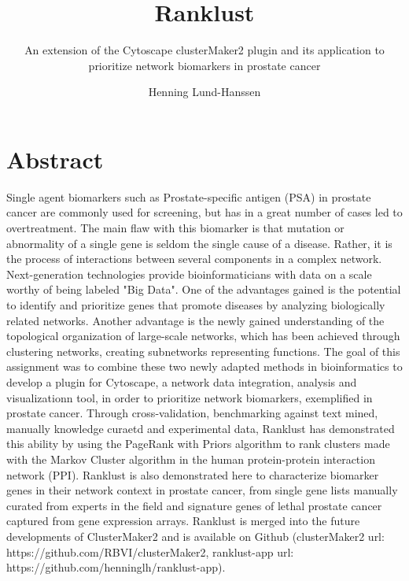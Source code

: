 \documentclass[a4paper,UKenglish]{ifimaster}
\title{Ranklust}
\subtitle{An extension of the Cytoscape clusterMaker2 plugin and its application
to prioritize network biomarkers in prostate cancer}
\author{Henning Lund-Hanssen}
\begin{document}
\duoforside[program={Programming and Networks},
    dept={Department of Informatics},long]

\frontmatter{}

\setlength{\parskip}{12pt}
\setlength{\parindent}{12pt}

\chapter*{Abstract}
Single agent biomarkers such as Prostate-specific antigen (PSA) in prostate
cancer are commonly used for screening, but has in a great number of cases led
to overtreatment. The main flaw with this biomarker is that mutation or
abnormality of a single gene is seldom the single cause of a disease. Rather, it
is the process of interactions between several components in a complex network.
Next-generation technologies provide bioinformaticians with data on a scale
worthy of being labeled "Big Data". One of the advantages gained is the
potential to identify and prioritize genes that promote diseases by analyzing
biologically related networks. Another advantage is the newly gained
understanding of the topological organization of large-scale networks, which has
been achieved through clustering networks, creating subnetworks representing
functions. The goal of this assignment was to combine these two newly adapted
methods in bioinformatics to develop a plugin for Cytoscape, a network data
integration, analysis and visualizationn tool, in order to prioritize network
biomarkers, exemplified in prostate cancer. Through cross-validation,
benchmarking against text mined, manually knowledge curaetd and experimental
data, Ranklust has demonstrated this ability by using the PageRank with Priors
algorithm to rank clusters made with the Markov Cluster algorithm in the human
protein-protein interaction network (PPI). Ranklust is also demonstrated here
to characterize biomarker genes in their network context in prostate cancer,
from single gene lists manually curated from experts in the field and signature
genes of lethal prostate cancer captured from gene expression arrays. Ranklust
is merged into the future developments of ClusterMaker2 and is available on
Github (clusterMaker2 url: https://github.com/RBVI/clusterMaker2, ranklust-app
url: https://github.com/henninglh/ranklust-app).
\end{document}
